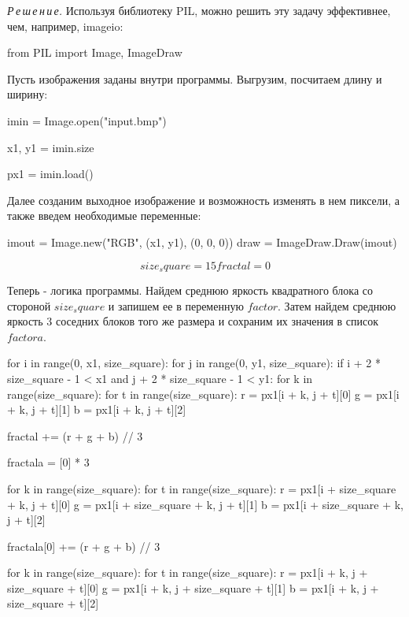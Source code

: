 \documentclass{article}
\newcommand\tab[1][1cm]{\hspace*{#1}}
\begin{document}
 
\textit{Р\,е\,ш\,е\,н\,и\,е.}  Используя библиотеку PIL, можно решить эту задачу эффективнее, чем, например, imageio:

\textsf{from PIL import Image, ImageDraw }

Пусть изображения заданы внутри программы. Выгрузим, посчитаем длину и ширину:
{

imin = Image.open("input.bmp")

x1, y1 = imin.size

px1 = imin.load()
}

 Далее созданим выходное изображение и возможность изменять в нем пиксели, а также введем необходимые переменные:
{

imout = Image.new("RGB", (x1, y1), (0, 0, 0))
draw = ImageDraw.Draw(imout)

\begin{equation}
size_square = 15
fractal = 0
\end{equation}


 Теперь - логика программы. Найдем среднюю яркость квадратного блока со стороной $size_square$ и запишем ее в переменную $factor $. Затем найдем среднюю яркость 3 соседних блоков того же размера и сохраним их значения в список $factora $.
 
{

for i in range(0, x1, size_square):
\tab[1cm]	for j in range(0, y1, size_square):
\tab[2cm]		if i + 2 * size_square - 1 < x1 and j + 2 * size_square - 1 < y1:
\tab[3cm]			for k in range(size_square):
\tab[4cm]				for t in range(size_square):
\tab[5cm]					r = px1[i + k, j + t][0]
\tab[5cm]					g = px1[i + k, j + t][1]
\tab[5cm]					b = px1[i + k, j + t][2]

\tab[5cm]					fractal += (r + g + b) // 3
		
\tab[3cm]			fractala = [0] * 3

\tab[3cm]			for k in range(size_square):
\tab[4cm]				for t in range(size_square):
\tab[5cm]					r = px1[i + size_square + k, j + t][0]
\tab[5cm]					g = px1[i + size_square + k, j + t][1]
\tab[5cm]					b = px1[i + size_square + k, j + t][2]

\tab[5cm]					fractala[0] += (r + g + b) // 3

\tab[3cm]			for k in range(size_square):
\tab[4cm]				for t in range(size_square):
\tab[5cm]					r = px1[i + k, j + size_square + t][0]
\tab[5cm]					g = px1[i + k, j + size_square + t][1]
\tab[5cm]					b = px1[i + k, j + size_square + t][2]

}}
\end{document}
